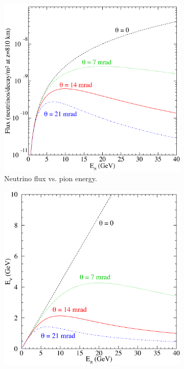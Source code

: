 \begin{figure}
  \centering
  \begin{subfigure}[b]{0.45\textwidth}
  \includegraphics[width=\textwidth]{../../img/baird/beam/020-flux.png}
  \caption{Neutrino flux vs. pion energy. }
  \label{fig:NuPiFluxa}
  \end{subfigure}
  \hfill
  \begin{subfigure}[b]{0.45\textwidth}
  \includegraphics[width=\textwidth]{../../img/baird/beam/030-epi2enu.png}

\end{subfigure}
\end{figure}
